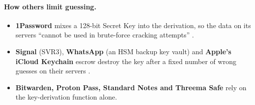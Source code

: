 \documentclass[11pt,a4paper]{article}
\begin{document}
\paragraph{How others limit guessing.}
\begin{itemize}
  \item \textbf{1Password} mixes a 128-bit Secret Key into the derivation, so the data on its servers ``cannot be used in brute-force cracking attempts'' \cite{onepw}.
  \item \textbf{Signal} (SVR3), \textbf{WhatsApp} (an HSM backup key vault) and \textbf{Apple's iCloud Keychain} escrow destroy the key after a fixed number of wrong guesses on their servers \cite{svr3,whatsappbk,applesec}.
  \item \textbf{Bitwarden, Proton Pass, Standard Notes and Threema Safe} rely on the key-derivation function alone.
\end{itemize}
\end{document}
